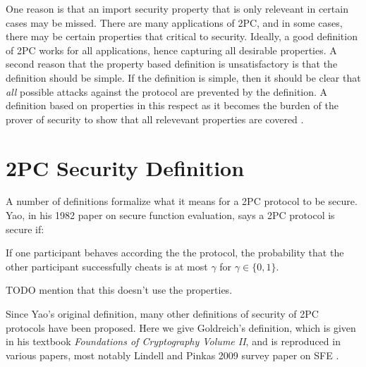 One reason is that an import security property that is only releveant in certain cases may be missed.
There are many applications of 2PC, and in some cases, there may be certain properties that critical to security.
Ideally, a good definition of 2PC works for all applications, hence capturing all desirable properties.
A second reason that the property based definition is unsatisfactory is that the definition should be simple.
If the definition is simple, then it should be clear that \textit{all} possible attacks against the protocol are prevented by the definition.
A definition based on properties in this respect as it becomes the burden of the prover of security to show that all relevevant properties are covered \cite{lindell2009secure}.

\section{2PC Security Definition}
A number of definitions formalize what it means for a 2PC protocol to be secure.
Yao, in his 1982 paper on secure function evaluation, says a 2PC protocol is secure if:

\begin{blockquote}
If one participant behaves according the the protocol, the probability that the other participant successfully cheats is at most $\gamma$ for $\gamma \in \{0,1\}$.
\cite{get-source}
\end{blockquote}

TODO mention that this doesn't use the properties.

Since Yao's original definition, many other definitions of security of 2PC protocols have been proposed.
Here we give Goldreich's definition, which is given in his textbook \textit{Foundations of Cryptography Volume II}, and is reproduced in various papers, most notably Lindell and Pinkas 2009 survey paper on SFE \cite{goldreich, lindell2009secure}.

